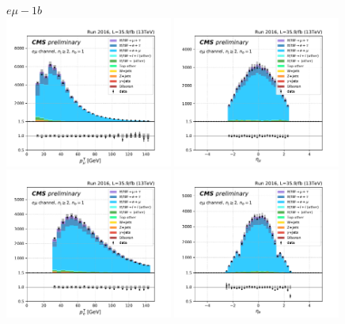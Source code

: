 \begin{figure}[ht]
    \centering
    $e \mu - 1b$ \\
    \includegraphics[width=0.49\textwidth]{chapters/Analysis/sectionPlots/figures/kinematics_pickles/emu2/1b/emu2_1b_lepton1_pt.pdf}
    \includegraphics[width=0.49\textwidth]{chapters/Analysis/sectionPlots/figures/kinematics_pickles/emu2/1b/emu2_1b_lepton1_eta.pdf}
    \includegraphics[width=0.49\textwidth]{chapters/Analysis/sectionPlots/figures/kinematics_pickles/emu2/1b/emu2_1b_lepton2_pt.pdf}
    \includegraphics[width=0.49\textwidth]{chapters/Analysis/sectionPlots/figures/kinematics_pickles/emu2/1b/emu2_1b_lepton2_eta.pdf}

\end{figure}
